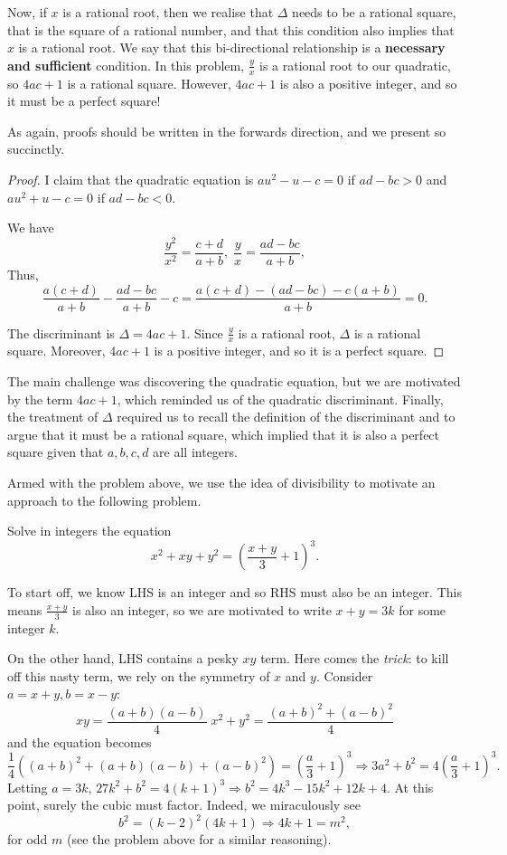 \documentclass[../main.tex]{subfiles}
\begin{document}
Now, if $x$ is a rational root, then we realise that $\Delta$ needs to be a rational square, that is the square of a rational number, and that this condition also implies that $x$ is a rational root. We say that this bi-directional relationship is a \textbf{necessary and sufficient} condition. In this problem, $\frac{y}{x}$ is a rational root to our quadratic, so $4ac+1$ is a rational square. However, $4ac+1$ is also a positive integer, and so it must be a perfect square!

As again, proofs should be written in the forwards direction, and we present so succinctly.
\begin{proof}
I claim that the quadratic equation is $au^2-u-c=0$ if $ad-bc > 0$ and $au^2+u-c=0$ if $ad-bc < 0$.

We have $$\frac{y^2}{x^2}=\frac{c+d}{a+b}, \; \frac{y}{x}=\frac{ad-bc}{a+b},$$
Thus, $$\frac{a(c+d)}{a+b}-\frac{ad-bc}{a+b}-c=\frac{a(c+d)-(ad-bc)-c(a+b)}{a+b}=0.$$

The discriminant is $\Delta=4ac+1$. Since $\frac{y}{x}$ is a rational root, $\Delta$ is a rational square. Moreover, $4ac+1$ is a positive integer, and so it is a perfect square.
\end{proof}
\begin{moral}
The main challenge was discovering the quadratic equation, but we are motivated by the term $4ac+1$, which reminded us of the quadratic discriminant. Finally, the treatment of $\Delta$ required us to recall the definition of the discriminant and to argue that it must be a rational square, which implied that it is also a perfect square given that $a,b,c,d$ are all integers.
\end{moral}

Armed with the problem above, we use the idea of divisibility to motivate an approach to the following problem.
\begin{example}
Solve in integers the equation
$$x^2+xy+y^2=\left(\frac{x+y}{3}+1\right)^3.$$
\end{example}
To start off, we know LHS is an integer and so RHS must also be an integer. This means $\frac{x+y}{3}$ is also an integer, so we are motivated to write $x+y=3k$ for some integer $k$.

On the other hand, LHS contains a pesky $xy$ term. Here comes the \textit{trick}: to kill off this nasty term, we rely on the symmetry of $x$ and $y$. Consider $a=x+y, b=x-y$:
    $$xy= \frac{(a+b)(a-b)}{4}\;x^2+y^2= \frac{(a+b)^2+(a-b)^2}{4}$$
and the equation becomes
$$\frac{1}{4}\left((a+b)^2+(a+b)(a-b)+(a-b)^2\right)=\left(\frac{a}{3}+1\right)^3 \Longrightarrow 3a^2+b^2=4\left(\frac{a}{3}+1\right)^3.$$
Letting $a=3k$, $27k^2+b^2=4(k+1)^3 \Longrightarrow b^2=4k^3-15k^2+12k+4$.
At this point, surely the cubic must factor. Indeed, we miraculously see
$$b^2=(k-2)^2(4k+1) \Longrightarrow 4k+1=m^2,$$
for odd $m$ (see the problem above for a similar reasoning).
\end{document}
